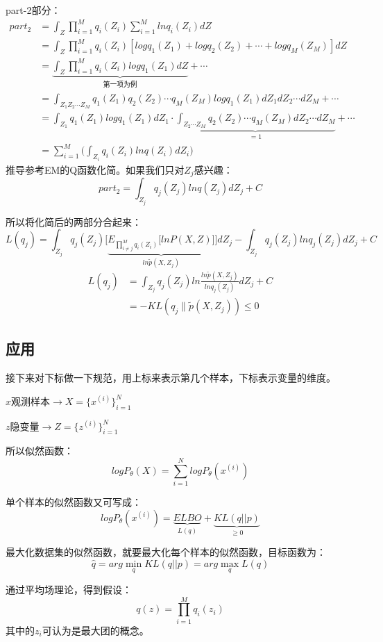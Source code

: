 \documentclass[UTF8]{ctexart} %
\begin{document}
				part-2部分：
					\[
					\begin{aligned}
					part_2 &=\int_Z\prod_{i=1}^Mq_i(Z_i)\sum_{i=1}^Mlnq_i(Z _i)dZ\\
					&=\int_Z\prod_{i=1}^Mq_i(Z_i)[logq_1(Z_1)+logq_2(Z_2)+\cdots+logq_M(Z_M)]dZ\\
					& = \underbrace{\int_Z\prod_{i=1}^Mq_i(Z_i)logq_1(Z_1)dZ}_{\text{第一项为例}} +\cdots\\
					& = \int_{Z_1Z_2\cdots Z_M}q_1(Z_1)q_2(Z_2)\cdots q_M(Z_M)logq_1(Z_1)dZ_1dZ_2\cdots dZ_M +\cdots\\
					& = \int_{Z_1}q_1(Z_1)logq_1(Z_1)dZ_1 \cdot \underbrace{\int_{Z_2\cdots Z_M}q_2(Z_2)\cdots q_M(Z_M)dZ_2\cdots dZ_M}_{=1}+\cdots\\
					&= \sum_{i=1}^M\Bigg(\int_{Z_i}q_i(Z_i)lnq(Z_i)dZ_i\Bigg)
					\end{aligned}\]
				推导参考EM的Q函数化简。如果我们只对$Z_j$感兴趣：
				\[part_2 = \int_{Z_j}q_j(Z_j)lnq(Z_j)dZ_j +C\]
				
				所以将化简后的两部分合起来：
				\[L(q_j) = \int_{Z_j} q_j(Z_j)\Bigg[\underbrace{E_{\prod_{i\neq j}^Mq_i(Z_i)}\bigg[lnP(X,Z)\bigg]}_{ln\tilde{p}(X,Z_j)}\Bigg]dZ_j - \int_{Z_j}q_j(Z_j)lnq_j(Z_j)dZ_j +C\]
				\[\begin{aligned}
				L(q_j) &= \int_{Z_j}q_j(Z_j)ln\frac{ln\tilde{p}(X,Z_j)}{lnq_j(Z_j)}dZ_j +C\\
				&=-KL(q_j\|\tilde{p}(X,Z_j))\leq 0
				\end{aligned}\]
			
			\subsection{应用}
			接下来对下标做一下规范，用上标来表示第几个样本，下标表示变量的维度。
			
			\qquad$x$观测样本$\rightarrow X=\{x^{(i)}\}_{i=1}^N$
			
			\qquad$z$隐变量$\rightarrow Z=\{z^{(i)}\}_{i=1}^N$
			
			所以似然函数：
			\[logP_\theta(X) = \sum_{i=1}^NlogP_\theta(x^{(i)})\]
			
			单个样本的似然函数又可写成：
			\[logP_\theta(x^{(i)}) = \underbrace{ELBO}_{L(q)} + \underbrace{KL(q||p)}_{\geq0}\]
			
			最大化数据集的似然函数，就要最大化每个样本的似然函数，目标函数为：
			\[\hat{q} = arg\min_qKL(q||p) = arg\max_qL(q)\]
			
			通过平均场理论，得到假设：
			\[q(z) = \prod_{i=1}^Mq_i(z_i)\]
			其中的$z_i$可认为是最大团的概念。
			
\end{document}
